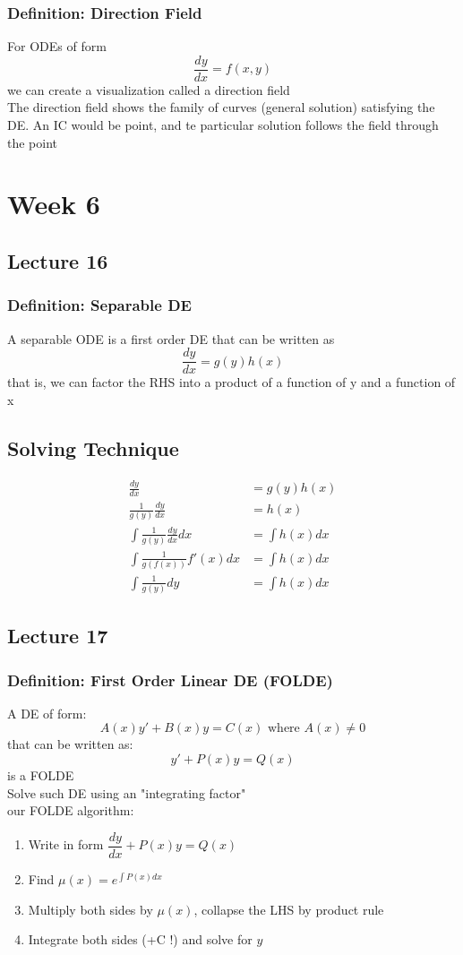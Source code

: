 \documentclass[12pt, letterpaper]{article}
\begin{document}
\subsubsection*{Definition: Direction Field}
For ODEs of form \[\frac{dy}{dx} = f(x,y)\] we can create a visualization called a direction field \\
The direction field shows the family of curves (general solution) satisfying the DE. An IC would be point,
and te particular solution follows the field through the point

\section{Week 6}
\subsection{Lecture 16}
\subsubsection{Definition: Separable DE}
A separable ODE is a first order DE that can be written as \[\frac{dy}{dx} = g(y)h(x)\]
that is, we can factor the RHS into a product of a function of y and a function of x 
\subsection*{Solving Technique}
\begin{align*}
    \frac{dy}{dx} &= g(y)h(x) \\
    \frac{1}{g(y)}\frac{dy}{dx} &= h(x) \\
    \int\frac{1}{g(y)}\frac{dy}{dx}dx &= \int h(x)dx \\
    \int\frac{1}{g(f(x))}f'(x)dx &= \int h(x)dx \\
    \int\frac{1}{g(y)}dy &= \int h(x)dx
\end{align*}
\subsection{Lecture 17}
\subsubsection{Definition: First Order Linear DE (FOLDE)}
A DE of form: \[A(x)y' + B(x)y = C(x) \text{ where } A(x)\neq0\]
that can be written as: \[y' + P(x)y = Q(x)\]
is a FOLDE \\
Solve such DE using an "integrating factor" \\
our FOLDE algorithm:
\begin{enumerate}
    \item Write in form $\dfrac{dy}{dx} + P(x)y = Q(x)$
    \item Find $\mu(x) = e^{\int P(x)dx}$
    \item Multiply both sides by $\mu(x)$, collapse the LHS by product rule 
    \item Integrate both sides (+C !) and solve for $y$
\end{enumerate}
\end{document}
